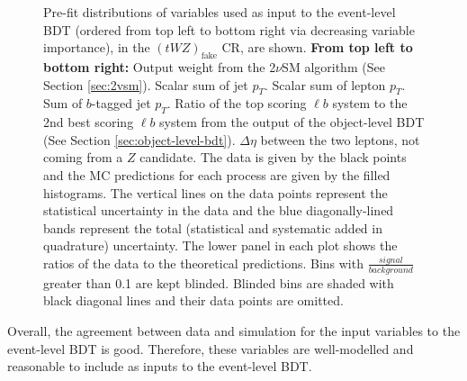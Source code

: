 \begin{figure}[htbp]
\caption{Pre-fit distributions of variables used as input to the event-level BDT (ordered from top left to bottom right via decreasing variable importance), in the $(tWZ)_{\text{fake}}$ CR, are shown. \textbf{From top left to bottom right:} Output weight from the 2$\nu$SM algorithm (See Section \ref{sec:2vsm}). Scalar sum of jet $p_{T}$. Scalar sum of lepton $p_{T}$. Sum of $b$-tagged jet $p_{T}$. Ratio of the top scoring $\ell b$ system to the 2nd best scoring $\ell b$ system from the output of the object-level BDT (See Section \ref{sec:object-level-bdt}). $\Delta \eta$ between the two leptons, not coming from a $Z$ candidate. The data is given by the black points and the MC predictions for each process are given by the filled histograms. The vertical lines on the data points represent the statistical uncertainty in the data and the blue diagonally-lined bands represent the total (statistical and systematic added in quadrature) uncertainty. The lower panel in each plot shows the ratios of the data to the theoretical predictions. Bins with $\frac{signal}{background}$ greater than 0.1 are kept blinded. Blinded bins are shaded with black diagonal lines and their data points are omitted.}
  \label{fig:4lep-tWZfakeCR-eventbdt-vars}
\end{figure}

Overall, the agreement between data and simulation for the input variables to the event-level BDT is good. Therefore, these variables are well-modelled and reasonable to include as inputs to the event-level BDT.\\

